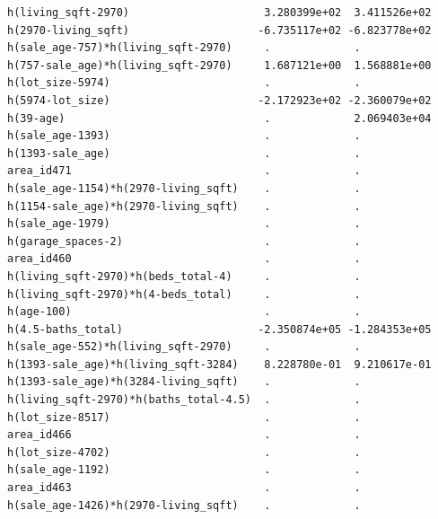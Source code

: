 \documentclass[
]{article}
\begin{document}
\begin{verbatim}
h(living_sqft-2970)                     3.280399e+02  3.411526e+02
h(2970-living_sqft)                    -6.735117e+02 -6.823778e+02
h(sale_age-757)*h(living_sqft-2970)     .             .           
h(757-sale_age)*h(living_sqft-2970)     1.687121e+00  1.568881e+00
h(lot_size-5974)                        .             .           
h(5974-lot_size)                       -2.172923e+02 -2.360079e+02
h(39-age)                               .             2.069403e+04
h(sale_age-1393)                        .             .           
h(1393-sale_age)                        .             .           
area_id471                              .             .           
h(sale_age-1154)*h(2970-living_sqft)    .             .           
h(1154-sale_age)*h(2970-living_sqft)    .             .           
h(sale_age-1979)                        .             .           
h(garage_spaces-2)                      .             .           
area_id460                              .             .           
h(living_sqft-2970)*h(beds_total-4)     .             .           
h(living_sqft-2970)*h(4-beds_total)     .             .           
h(age-100)                              .             .           
h(4.5-baths_total)                     -2.350874e+05 -1.284353e+05
h(sale_age-552)*h(living_sqft-2970)     .             .           
h(1393-sale_age)*h(living_sqft-3284)    8.228780e-01  9.210617e-01
h(1393-sale_age)*h(3284-living_sqft)    .             .           
h(living_sqft-2970)*h(baths_total-4.5)  .             .           
h(lot_size-8517)                        .             .           
area_id466                              .             .           
h(lot_size-4702)                        .             .           
h(sale_age-1192)                        .             .           
area_id463                              .             .           
h(sale_age-1426)*h(2970-living_sqft)    .             .           
                                                                  

\end{verbatim}
\end{document}
